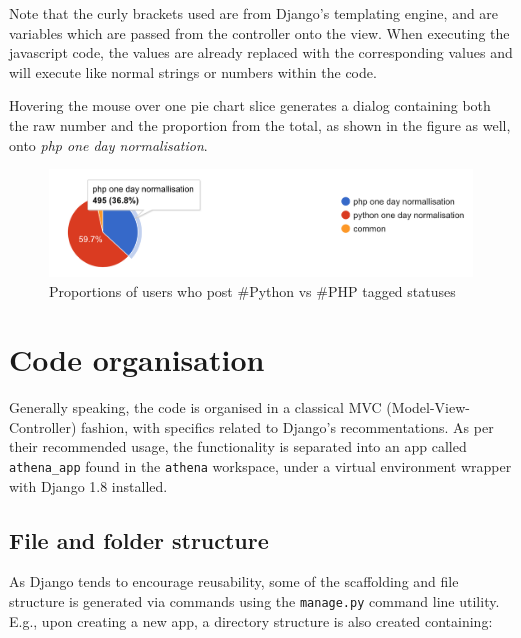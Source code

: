 \documentclass[12pt,a4paper,twoside]{report}
\begin{document}
Note that the curly brackets used are from Django's templating engine, and are variables which are passed from the controller onto the view. When executing the javascript code, the values are already replaced with the corresponding values and will execute like normal strings or numbers within the code.

Hovering the mouse over one pie chart slice generates a dialog containing both the raw number and the proportion from the total, as shown in the figure as well, onto \emph{php one day normalisation}.

\begin{figure}
    \centering
\includegraphics[width=\columnwidth]{img/piechart.png}
    \caption{Proportions of users who post \#Python vs \#PHP tagged statuses}
    \label{fig:piechart}
\end{figure}

\section{Code organisation}
Generally speaking, the code is organised in a classical MVC (Model-View-Controller) fashion, with specifics related to Django's recommentations. As per their recommended usage, the functionality is separated into an app called \texttt{athena\_app} found in the \texttt{athena} workspace, under a virtual environment wrapper with Django 1.8 installed. 

\subsection{File and folder structure}
As Django tends to encourage reusability, some of the scaffolding and file structure is generated via commands using the \texttt{manage.py} command line utility. E.g., upon creating a new app, a directory structure is also created containing:
\end{document}
